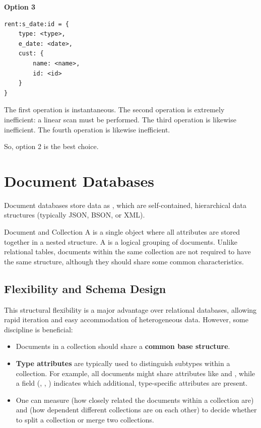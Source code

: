 \begin{example}{}
\vspace{2mm}
\textbf{Option 3}

\begin{verbatim}
rent:s_date:id = { 
    type: <type>, 
    e_date: <date>, 
    cust: { 
        name: <name>, 
        id: <id> 
    } 
}
\end{verbatim}

The first operation is instantaneous.
The second operation is extremely inefficient: a linear scan must be performed.
The third operation is likewise inefficient.
The fourth operation is likewise inefficient.

\vspace{2mm}
\noindent
So, option 2 is the best choice.
\end{example}

\section{Document Databases}

Document databases store data as , which are self-contained, hierarchical data structures (typically JSON, BSON, or XML).

\begin{definition}{Document and Collection}
    A  is a single object where all attributes are stored together in a nested structure. A  is a logical grouping of documents. Unlike relational tables, documents within the same collection are not required to have the same structure, although they should share some common characteristics.
\end{definition}

\subsection{Flexibility and Schema Design}

This structural flexibility is a major advantage over relational databases, allowing rapid iteration and easy accommodation of heterogeneous data. However, some discipline is beneficial:

\begin{itemize}
    \item Documents in a collection should share a \textbf{common base structure}.
    \item \textbf{Type attributes} are typically used to distinguish subtypes within a collection. For example, all  documents might share attributes like  and , while a  field (, , ) indicates which additional, type-specific attributes are present.
    \item One can measure  (how closely related the documents within a collection are) and  (how dependent different collections are on each other) to decide whether to split a collection or merge two collections.
\end{itemize}

